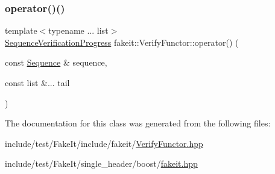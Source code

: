 \subsubsection{\texorpdfstring{operator()()}{operator()()}\hspace{0.1cm}{\footnotesize\ttfamily [9/9]}}
{\footnotesize\ttfamily template$<$typename ... list$>$ \\
\mbox{\hyperlink{classfakeit_1_1SequenceVerificationProgress}{Sequence\+Verification\+Progress}} fakeit\+::\+Verify\+Functor\+::operator() (\begin{DoxyParamCaption}\item[{const \mbox{\hyperlink{classfakeit_1_1Sequence}{Sequence}} \&}]{sequence,  }\item[{const list \&...}]{tail }\end{DoxyParamCaption})\hspace{0.3cm}{\ttfamily [inline]}}



The documentation for this class was generated from the following files\+:\begin{DoxyCompactItemize}
\item 
include/test/\+Fake\+It/include/fakeit/\mbox{\hyperlink{VerifyFunctor_8hpp}{Verify\+Functor.\+hpp}}\item 
include/test/\+Fake\+It/single\+\_\+header/boost/\mbox{\hyperlink{single__header_2boost_2fakeit_8hpp}{fakeit.\+hpp}}\end{DoxyCompactItemize}
